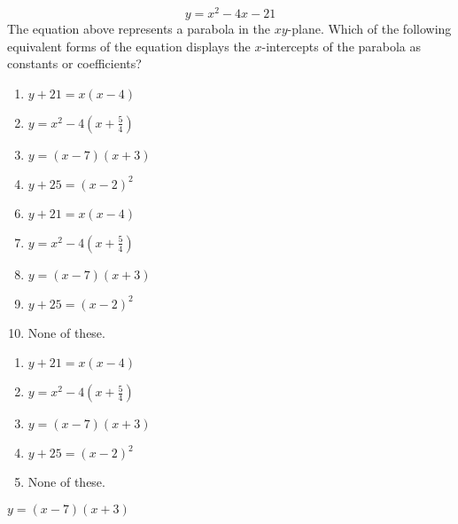  
$$ y=x^2-4x-21$$
The equation above represents a parabola in the $xy$-plane.  Which of the following equivalent forms of the equation displays the $x$-intercepts of the parabola as constants or coefficients?


\ifsat
	\begin{enumerate}[label=\Alph*)]
		\item $y+21=x(x-4) $ 
		\item $y=x^2-4(x+\frac{5}{4}) $ 
		\item $y=(x-7)(x+3) $ %
		\item $y+25=(x-2)^2 $
	\end{enumerate}
\else
\fi

\ifacteven
	\begin{enumerate}[label=\textbf{\Alph*.},itemsep=\fill,align=left]
		\setcounter{enumii}{5}
		\item $y+21=x(x-4) $ 
		\item $y=x^2-4(x+\frac{5}{4}) $ 
		\item $y=(x-7)(x+3) $ %
		\addtocounter{enumii}{1}
		\item $y+25=(x-2)^2 $
		\item None of these. 
	\end{enumerate}
\else
\fi

\ifactodd
	\begin{enumerate}[label=\textbf{\Alph*.},itemsep=\fill,align=left]
		\item $y+21=x(x-4) $ 
		\item $y=x^2-4(x+\frac{5}{4}) $ 
		\item $y=(x-7)(x+3) $ %
		\item $y+25=(x-2)^2 $
		\item None of these. 
	\end{enumerate}
\else
\fi

\ifgridin
 $y=(x-7)(x+3) $ %
		
\else
\fi

